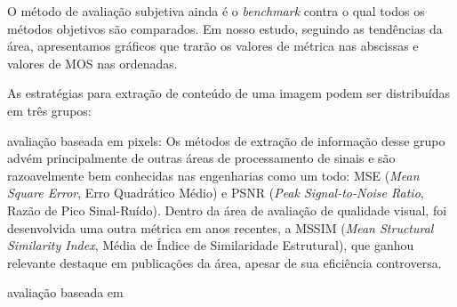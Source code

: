 O método de avaliação subjetiva ainda é o \emph{benchmark} contra o qual todos os métodos objetivos são comparados. Em nosso estudo, seguindo as tendências da área, apresentamos gráficos que trarão os valores de métrica nas abscissas e valores de MOS nas ordenadas.

As estratégias para extração de conteúdo de uma imagem podem ser distribuídas em três grupos:

\begin{description}
	\item{avaliação baseada em pixels:}
		Os métodos de extração de informação desse grupo advém principalmente de outras áreas de processamento de sinais e são razoavelmente bem conhecidas nas engenharias como um todo: MSE (\emph{Mean Square Error}, Erro Quadrático Médio) e PSNR (\emph{Peak Signal-to-Noise Ratio}, Razão de Pico Sinal-Ruído). Dentro da área de avaliação de qualidade visual, foi desenvolvida uma outra métrica em anos recentes, a MSSIM (\emph{Mean Structural Similarity Index}, Média de Índice de Similaridade Estrutural), que ganhou relevante destaque em publicações da área, apesar de sua eficiência controversa.
	\item{avaliação baseada em }

\end{description}

